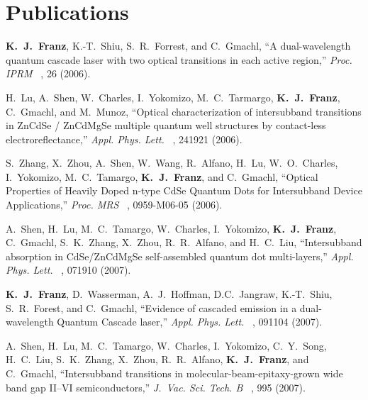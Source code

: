 %


\chapter*{Publications}
\renewcommand{\chaptermark}[1]{%
\markboth{\normalfont \textbf{\textsl{#1}}}{}}

\chaptermark{Publications}



\begin{list}{}{
  \setlength{\leftmargin}{0.25in}
  \setlength{\rightmargin}{0.25in}
  \setlength{\itemsep}{6pt}
}
\item \textbf{K.~J.~Franz}, K.-T.~Shiu, S.~R.~Forrest, and C.~Gmachl, ``A dual-wavelength quantum cascade laser with two optical transitions in each active region,'' \emph{Proc. IPRM}~ , 26 (2006).
\item H.~Lu, A.~Shen, W.~Charles, I.~Yokomizo, M.~C.~Tarmargo, \textbf{K.~J.~Franz}, C.~Gmachl, and M.~Munoz, ``Optical characterization of intersubband transitions in ZnCdSe / ZnCdMgSe multiple quantum well structures by contact-less electroreflectance,'' \emph{Appl. Phys. Lett.}~ , 241921 (2006).
\item S.~Zhang, X.~Zhou, A.~Shen, W.~Wang, R.~Alfano, H.~Lu, W.~O.~Charles, I.~Yokomizo, M.~C.~Tamargo, \textbf{K.~J.~Franz}, and C.~Gmachl, ``Optical Properties of Heavily Doped  n-type CdSe Quantum Dots for Intersubband Device Applications,'' \emph{Proc. MRS}~ , 0959-M06-05 (2006).
\item A.~Shen, H.~Lu, M.~C.~Tamargo, W.~Charles, I.~Yokomizo, \textbf{K.~J.~Franz}, C.~Gmachl, S.~K.~Zhang, X.~Zhou, R.~R.~Alfano, and H.~C.~Liu, ``Intersubband absorption in CdSe/ZnCdMgSe self-assembled quantum dot multi-layers,'' \emph{Appl. Phys. Lett.}~ , 071910 (2007).
\item \textbf{K.~J.~Franz}, D.~Wasserman, A.~J.~Hoffman, D.C.~Jangraw, K.-T.~Shiu, S.~R.~Forest, and C.~Gmachl, ``Evidence of cascaded emission in a dual-wavelength Quantum Cascade laser,'' \emph{Appl. Phys. Lett.}~ , 091104 (2007).
\item A.~Shen, H.~Lu, M.~C.~Tamargo, W.~Charles, I.~Yokomizo, C.~Y.~Song, H.~C.~Liu,  S.~K.~Zhang, X.~Zhou, R.~R.~Alfano, \textbf{K.~J.~Franz}, and C.~Gmachl, ``Intersubband transitions in molecular-beam-epitaxy-grown wide band gap II--VI semiconductors,'' \emph{J.~Vac. Sci. Tech. B}~ , 995 (2007).

\end{list}
